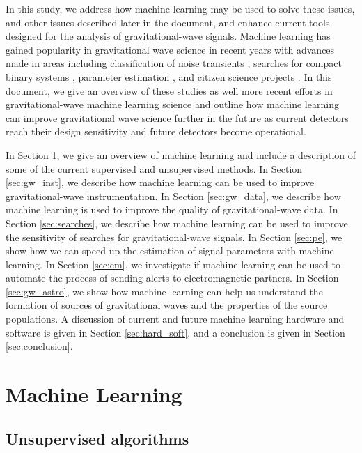 \documentclass[letterpaper, aps, prd, superscriptaddress, showpacs, nofootinbib]{revtex4}
\begin{document}
In this study, we address how machine learning may be used to solve these issues, and other issues described later in the document, and enhance current tools designed for the analysis of gravitational-wave signals. Machine learning has gained popularity in gravitational wave science in recent years with advances made in areas including classification of noise transients \cite{powell:15, powell:16,PhysRevD.95.104059, 2017arXiv170607446G}, searches for compact binary systems \cite{PhysRevLett.120.141103, 2018PhLB..778...64G}, parameter estimation \cite{2012MNRAS.421..169G}, and citizen science projects \cite{gravityspy}. In this document, we give an overview of these studies as well more recent efforts in gravitational-wave machine learning science and outline how machine learning can improve gravitational wave science further in the future as current detectors reach their design sensitivity and future detectors become operational.   

In Section \ref{sec:mla}, we give an overview of machine learning and include a description of some of the current supervised and unsupervised methods. In Section \ref{sec:gw_inst}, we describe how machine learning can be used to improve gravitational-wave instrumentation. In Section \ref{sec:gw_data}, we describe how machine learning is used to improve the quality of gravitational-wave data. In Section \ref{sec:searches}, we describe how machine learning can be used to improve the sensitivity of searches for gravitational-wave signals. In Section \ref{sec:pe}, we show how we can speed up the estimation of signal parameters with machine learning. In Section \ref{sec:em}, we investigate if machine learning can be used to automate the process of sending alerts to electromagnetic partners. In Section \ref{sec:gw_astro}, we show how machine learning can help us understand the formation of sources of gravitational waves and the properties of the source populations. A discussion of current and future machine learning hardware and software is given in Section \ref{sec:hard_soft}, and a conclusion is given in Section \ref{sec:conclusion}.  

\section{Machine Learning}
\label{sec:mla}


\subsection{Unsupervised algorithms}
\end{document}
